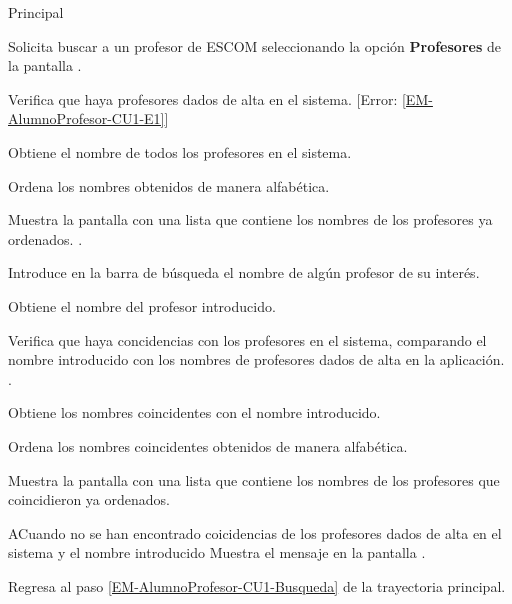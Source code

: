 \begin{UCtrayectoria}{Principal}

	\UCpaso [\UCactor] Solicita buscar a un profesor de ESCOM seleccionando la opción \textbf{Profesores} de la pantalla .

	\UCpaso Verifica que haya profesores dados de alta en el sistema. [Error: \ref{EM-AlumnoProfesor-CU1-E1}] 

	\UCpaso Obtiene el nombre de todos los profesores en el sistema. 

	\UCpaso Ordena los nombres obtenidos de manera alfabética. 

	\UCpaso Muestra la pantalla  con una lista que contiene los nombres de los profesores ya ordenados. \label{EM-AlumnoProfesor-CU1-Busqueda}.

	\UCpaso [\UCactor] Introduce en la barra de búsqueda el nombre de algún profesor de su interés. 

	\UCpaso Obtiene el nombre del profesor introducido.

	\UCpaso Verifica que haya concidencias con los profesores en el sistema, comparando el nombre introducido con los nombres de profesores dados de alta en la aplicación. .

	\UCpaso Obtiene los nombres coincidentes con el nombre introducido.

	\UCpaso Ordena los nombres coincidentes obtenidos de manera alfabética. 

	\UCpaso Muestra la pantalla  con una lista que contiene los nombres de los profesores que coincidieron ya ordenados. 

\end{UCtrayectoria}

\begin{UCtrayectoriaA}{A}{Cuando no se han encontrado coicidencias de los profesores dados de alta en el sistema y el nombre introducido}
	\UCpaso Muestra el mensaje  en la pantalla .

	\UCpaso Regresa al paso \ref{EM-AlumnoProfesor-CU1-Busqueda} de la trayectoria principal.
\end{UCtrayectoriaA}



